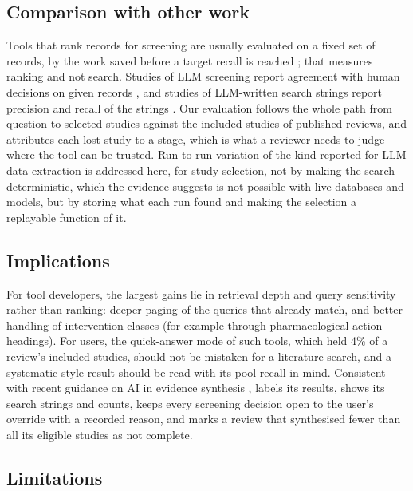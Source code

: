 \subsection{Comparison with other work}

Tools that rank records for screening are usually evaluated on a fixed set of records, by the work saved before a
target recall is reached \citep{omara2015using,vandeschoot2021open}; that measures ranking and not search. Studies of
LLM screening report agreement with human decisions on given records \citep{guo2024automated,khraisha2024can}, and
studies of LLM-written search strings report precision and recall of the strings \citep{wang2023can}. Our evaluation
follows the whole path from question to selected studies against the included studies of published reviews, and
attributes each lost study to a stage, which is what a reviewer needs to judge where the tool can be trusted. Run-to-run
variation of the kind reported for LLM data extraction \citep{lagisz2026elicit} is addressed here, for study
selection, not by making the search deterministic, which the evidence suggests is not possible with live databases and models, but by
storing what each run found and making the selection a replayable function of it.

\subsection{Implications}

For tool developers, the largest gains lie in retrieval depth and query sensitivity rather than ranking: deeper
paging of the queries that already match, and better handling of intervention classes (for example through
pharmacological-action headings). For users, the quick-answer mode of such tools, which held 4\% of a review's
included studies, should not be mistaken for a literature search, and a systematic-style result should be read with
its pool recall in mind. Consistent with recent guidance on AI in evidence synthesis \citep{raise2026}, \tool{}
labels its results, shows its search strings and counts, keeps every screening decision open to the user's override
with a recorded reason, and marks a review that synthesised fewer than all its eligible studies as not complete.

\subsection{Limitations}
\label{sec:limits}


